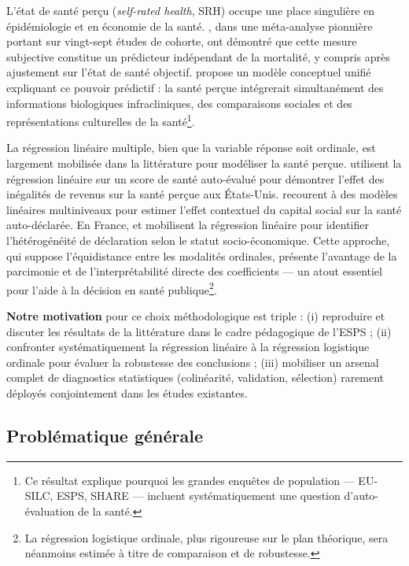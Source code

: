 \documentclass[11pt,a4paper]{memoirerecherche}
\begin{document}
L'état de santé perçu (\emph{self-rated health}, SRH) occupe une place singulière en épidémiologie et en économie de la santé. \textcite{idler1997}, dans une méta-analyse pionnière portant sur vingt-sept études de cohorte, ont démontré que cette mesure subjective constitue un prédicteur indépendant de la mortalité, y compris après ajustement sur l'état de santé objectif. \textcite{jylha2009} propose un modèle conceptuel unifié expliquant ce pouvoir prédictif : la santé perçue intégrerait simultanément des informations biologiques infracliniques, des comparaisons sociales et des représentations culturelles de la santé\footnote{Ce résultat explique pourquoi les grandes enquêtes de population --- EU-SILC, ESPS, SHARE --- incluent systématiquement une question d'auto-évaluation de la santé.}.

La régression linéaire multiple, bien que la variable réponse soit ordinale, est largement mobilisée dans la littérature pour modéliser la santé perçue. \textcite{kennedy1998} utilisent la régression linéaire sur un score de santé auto-évalué pour démontrer l'effet des inégalités de revenus sur la santé perçue aux États-Unis. \textcite{subramanian2002} recourent à des modèles linéaires multiniveaux pour estimer l'effet contextuel du capital social sur la santé auto-déclarée. En France, \textcite{devaux2010} et \textcite{etile2007} mobilisent la régression linéaire pour identifier l'hétérogénéité de déclaration selon le statut socio-économique. Cette approche, qui suppose l'équidistance entre les modalités ordinales, présente l'avantage de la parcimonie et de l'interprétabilité directe des coefficients --- un atout essentiel pour l'aide à la décision en santé publique\footnote{La régression logistique ordinale, plus rigoureuse sur le plan théorique, sera néanmoins estimée à titre de comparaison et de robustesse.}.

\textbf{Notre motivation} pour ce choix méthodologique est triple : (i) reproduire et discuter les résultats de la littérature dans le cadre pédagogique de l'ESPS ; (ii) confronter systématiquement la régression linéaire à la régression logistique ordinale pour évaluer la robustesse des conclusions ; (iii) mobiliser un arsenal complet de diagnostics statistiques (colinéarité, validation, sélection) rarement déployés conjointement dans les études existantes.

\hypertarget{probluxe9matique-guxe9nuxe9rale}{%
\subsection{Problématique générale}\label{probluxe9matique-guxe9nuxe9rale}}
\end{document}
